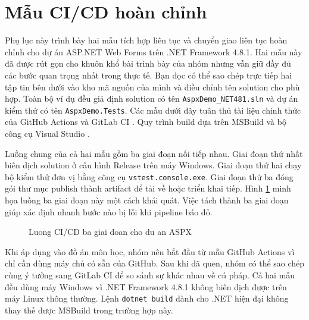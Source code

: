 \section{Mẫu CI/CD hoàn chỉnh}
\label{sec:pc-tongquan}

Phụ lục này trình bày hai mẫu tích hợp liên tục và chuyển giao liên tục hoàn chỉnh cho dự án ASP.NET Web Forms trên .NET Framework 4.8.1.
Hai mẫu này đã được rút gọn cho khuôn khổ bài trình bày của nhóm nhưng vẫn giữ đầy đủ các bước quan trọng nhất trong thực tế.
Bạn đọc có thể sao chép trực tiếp hai tập tin bên dưới vào kho mã nguồn của mình và điều chỉnh tên solution cho phù hợp.
Toàn bộ ví dụ đều giả định solution có tên \verb|AspxDemo_NET481.sln| và dự án kiểm thử có tên \verb|AspxDemo.Tests|.
Các mẫu dưới đây tuân thủ tài liệu chính thức của GitHub Actions \cite{ghactions,githubdocs} và GitLab CI \cite{gitlabci,gitlabdocs}.
Quy trình build dựa trên MSBuild và bộ công cụ Visual Studio \cite{msmsbuild,msnetfx}.

Luồng chung của cả hai mẫu gồm ba giai đoạn nối tiếp nhau.
Giai đoạn thứ nhất biên dịch solution ở cấu hình Release trên máy Windows.
Giai đoạn thứ hai chạy bộ kiểm thử đơn vị bằng công cụ \verb|vstest.console.exe|.
Giai đoạn thứ ba đóng gói thư mục publish thành artifact để tải về hoặc triển khai tiếp.
Hình \ref{fig:pc-luong} minh họa luồng ba giai đoạn này một cách khái quát.
Việc tách thành ba giai đoạn giúp xác định nhanh bước nào bị lỗi khi pipeline báo đỏ.

\begin{figure}[H]
\centering
{}
\caption{Luong CI/CD ba giai doan cho du an ASPX}
\label{fig:pc-luong}
\end{figure}

Khi áp dụng vào đồ án môn học, nhóm nên bắt đầu từ mẫu GitHub Actions vì chỉ cần dùng máy chủ có sẵn của GitHub.
Sau khi đã quen, nhóm có thể sao chép cùng ý tưởng sang GitLab CI để so sánh sự khác nhau về cú pháp.
Cả hai mẫu đều dùng máy Windows vì .NET Framework 4.8.1 không biên dịch được trên máy Linux thông thường.
Lệnh \verb|dotnet build| dành cho .NET hiện đại không thay thế được MSBuild trong trường hợp này.

